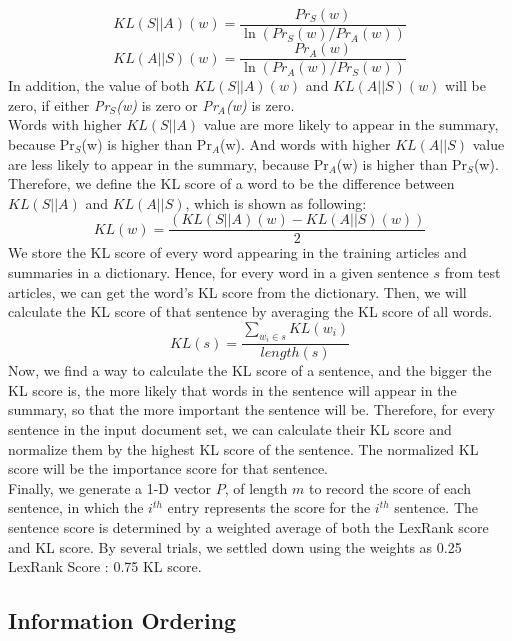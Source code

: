 \documentclass[11pt]{article}
\begin{document}
\begin{equation}
KL(S||A)(w) = \frac{Pr_S(w)}{\ln(Pr_S(w)/Pr_A(w))}
\end{equation}
\begin{equation}
KL(A||S)(w) = \frac{Pr_A(w)}{\ln(Pr_A(w)/Pr_S(w))}
\end{equation}
In addition, the value of both $KL(S||A)(w)$ and $KL(A||S)(w)$ will be zero, if either \emph{Pr$_S$(w)} is zero or \emph{Pr$_A$(w)} is zero. \\
\indent
Words with higher $KL(S||A)$ value are more likely to appear in the summary, because Pr$_S$(w) is higher than Pr$_A$(w). And words with higher $KL(A||S)$ value are less likely to appear in the summary, because Pr$_A$(w) is higher than Pr$_S$(w). Therefore, we define the KL score of a word to be the difference between $KL(S||A)$ and $KL(A||S)$, which is shown as following:
\begin{equation}
KL(w) = \frac{(KL(S||A)(w) - KL(A||S)(w))}{2}
\end{equation}
\indent
We store the KL score of every word appearing in the training articles and summaries in a dictionary. Hence, for every word in a given sentence $s$ from test articles, we can get the word's KL score from the dictionary. Then, we will calculate the KL score of that sentence by averaging the KL score of all words. 
\begin{equation}
KL(s) = \frac{\sum_{w_i \in s}\displaystyle KL(w_i)}{length(s)}
\end{equation}
\indent
Now, we find a way to calculate the KL score of a sentence, and the bigger the KL score is, the more likely that words in the sentence will appear in the summary, so that the more important the sentence will be. Therefore, for every sentence in the input document set, we can calculate their KL score and normalize them by the highest KL score of the sentence. The normalized KL score will be the importance score for that sentence.\\ 
\indent
Finally, we generate a 1-D vector $P$,  of length $m$ to record the score of each sentence, in which the $i^{th}$ entry represents the score for the $i^{th}$ sentence. The sentence score is determined by a weighted average of both the LexRank score and KL score. By several trials, we settled down using the weights as 0.25 LexRank Score : 0.75 KL score.\\

\subsection{Information Ordering}
\end{document}
